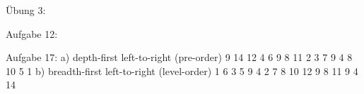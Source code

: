 Übung 3:

Aufgabe 12:


Aufgabe 17:
a) depth-first left-to-right (pre-order)
9 14 12 4 6 9 8 11 2 3 7 9 4 8 10 5 1
b) breadth-first left-to-right (level-order)
1 6 3 5 9 4 2 7 8 10 12 9 8 11 9 4 14